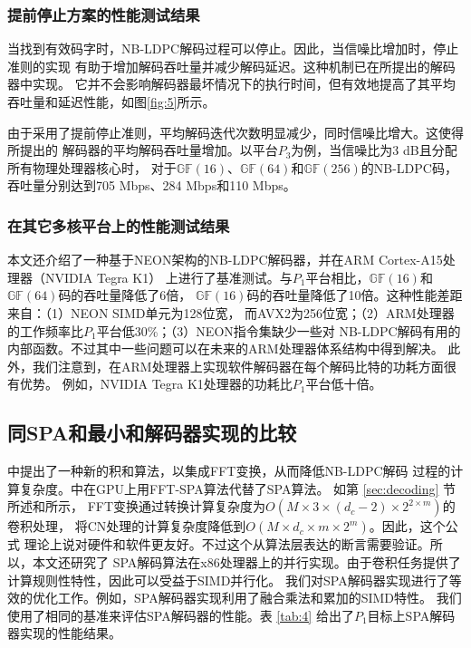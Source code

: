 \documentclass{cjc}
\begin{document}
\subsubsection{提前停止方案的性能测试结果}

  当找到有效码字时，NB-LDPC解码过程可以停止。因此，当信噪比增加时，停止准则的实现
  有助于增加解码吞吐量并减少解码延迟。这种机制已在所提出的解码器中实现。
  它并不会影响解码器最坏情况下的执行时间，但有效地提高了其平均吞吐量和延迟性能，如图\ref{fig:5}所示。

  由于采用了提前停止准则，平均解码迭代次数明显减少，同时信噪比增大。这使得所提出的
  解码器的平均解码吞吐量增加。以平台$P_3$为例，当信噪比为3 dB且分配所有物理处理器核心时，
  对于$\mathbb{GF}(16)$、$\mathbb{GF}(64)$和$\mathbb{GF}(256)$的NB-LDPC码，
  吞吐量分别达到705 Mbps、284 Mbps和110 Mbps。

\subsubsection{在其它多核平台上的性能测试结果}

  本文还介绍了一种基于NEON架构的NB-LDPC解码器，并在ARM Cortex-A15处理器（NVIDIA Tegra K1）
  上进行了基准测试。与$P_1$平台相比，$\mathbb{GF}(16)$和$\mathbb{GF}(64)$码的吞吐量降低了6倍，
  $\mathbb{GF}(16)$码的吞吐量降低了10倍。这种性能差距来自：（1）NEON SIMD单元为128位宽，
  而AVX2为256位宽；（2）ARM处理器的工作频率比$P_1$平台低30\%；（3）NEON指令集缺少一些对
  NB-LDPC解码有用的内部函数。不过其中一些问题可以在未来的ARM处理器体系结构中得到解决。
  此外，我们注意到，在ARM处理器上实现软件解码器在每个解码比特的功耗方面很有优势。
  例如，NVIDIA Tegra K1处理器的功耗比$P_1$平台低十倍。

\subsection{同SPA和最小和解码器实现的比较}

  \cite{declercq_decoding_2007}中提出了一种新的积和算法，以集成FFT变换，从而降低NB-LDPC解码
  过程的计算复杂度。\cite{noauthor_andrade_nodate}中在GPU上用FFT-SPA算法代替了SPA算法。
  如第 \ref{sec:decoding} 节所述和\cite{comparison_NBLDPC,noauthor_andrade_nodate}所示，
  FFT变换通过转换计算复杂度为$O(M\times3\times(d_c−2)\times2^{2\times{m}})$的卷积处理，
  将CN处理的计算复杂度降低到$O(M\times{d_c}\times{m}\times2^m)$。因此，这个公式
  理论上说对硬件和软件更友好。不过这个从算法层表达的断言需要验证。所以，本文还研究了
  SPA解码算法在x86处理器上的并行实现。由于卷积任务提供了计算规则性特性，因此可以受益于SIMD并行化。
  我们对SPA解码器实现进行了等效的优化工作。例如，SPA解码器实现利用了融合乘法和累加的SIMD特性。
  我们使用了相同的基准来评估SPA解码器的性能。表 \ref{tab:4} 给出了$P_1$目标上SPA解码器实现的性能结果。
\end{document}
